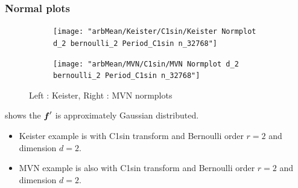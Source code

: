 \documentclass[handout, 10pt,compress,xcolor={usenames,dvipsnames}]{beamer} %
\begin{document}
\begin{frame}
\frametitle{Normal plots}
\vspace{-5ex}
\begin{figure}[htp]
\captionsetup[subfigure]{labelformat=empty}
\centering
\begin{subfigure}[b]{0.49\textwidth}
\texttt{[image: "arbMean/Keister/C1sin/Keister Normplot d\_2 bernoulli\_2 Period\_C1sin n\_32768"]}
\end{subfigure}
\centering
\begin{subfigure}[b]{0.49\textwidth}
\texttt{[image: "arbMean/MVN/C1sin/MVN Normplot d\_2 bernoulli\_2 Period\_C1sin n\_32768"]}
\end{subfigure}
\caption{ Left : Keister, Right : MVN normplots}
\end{figure}
\vspace{-3ex}
shows the $\boldsymbol{f}'$ is approximately Gaussian distributed.
\vspace{-3ex}
\begin{itemize}
\item
Keister example is with C1sin transform and Bernoulli order $r=2$ and dimension $d=2$.
\item
MVN example is also with C1sin transform and Bernoulli order $r=2$ and dimension $d=2$.
\end{itemize}
\end{frame}

\fi
\end{document}

